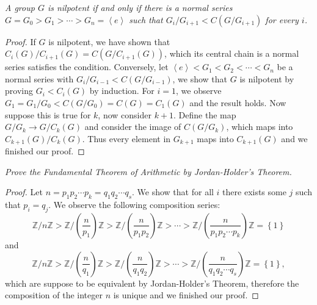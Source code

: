 \begin{problem}\em
A group $G$ is nilpotent if and only if there is a normal series $G=G_0>G_1>\cdots>G_n=\left<e\right>$ such that $G_i/G_{i+1}<C(G/G_{i+1})$ for every $i$.
\end{problem}
\begin{proof}
If $G$ is nilpotent, we have shown that $C_i\left( G \right) /C_{i+1}\left( G \right) =C\left( G/C_{i+1}\left( G \right) \right) $, which its central chain is a normal series satisfies the condition. Conversely, let $\left< e \right> <G_1<G_2<\cdots <G_n$ be a normal series with $G_i/G_{i-1}<C\left( G/G_{i-1} \right) $, we show that $G$ is nilpotent by proving $G_i<C_i\left( G \right) $ by induction. For $i=1$, we observe $G_1=G_1/G_0<C\left( G/G_0 \right) =C\left( G \right) =C_1\left( G \right) $ and the result holds. Now suppose this is true for $k$, now consider $k+1$. Define the map $G/G_{k}\to G/C_k(G)$ and consider the image of $C(G/G_k)$, which maps into $C_{k+1}(G)/C_k(G)$. Thus every element in $G_{k+1}$ maps into $C_{k+1}(G)$ and we finished our proof.
\end{proof}
\begin{problem}\em
Prove the Fundamental Theorem of Arithmetic by Jordan-Holder's Theorem.
\end{problem}
\begin{proof}
Let $n=p_1p_2\cdots p_k=q_1q_2\cdots q_s$. We show that for all $i$ there exists some $j$ such that $p_i=q_j$. We observe the following composition series: 
$$
\mathbb{Z} /n\mathbb{Z} >\mathbb{Z} /\left( \frac{n}{p_1} \right) \mathbb{Z} >\mathbb{Z} /\left( \frac{n}{p_1p_2} \right) \mathbb{Z} >\cdots >\mathbb{Z} /\left( \frac{n}{p_1p_2\cdots p_k} \right) \mathbb{Z} =\left\{ 1 \right\} 
$$
and 
$$
\mathbb{Z} /n\mathbb{Z} >\mathbb{Z} /\left( \frac{n}{q_1} \right) \mathbb{Z} >\mathbb{Z} /\left( \frac{n}{q_1q_2} \right) \mathbb{Z} >\cdots >\mathbb{Z} /\left( \frac{n}{q_1q_2\cdots q_s} \right) \mathbb{Z} =\left\{ 1 \right\} ,
$$
which are suppose to be equivalent by Jordan-Holder's Theorem, therefore the composition of the integer $n$ is unique and we finished our proof.
\end{proof}
